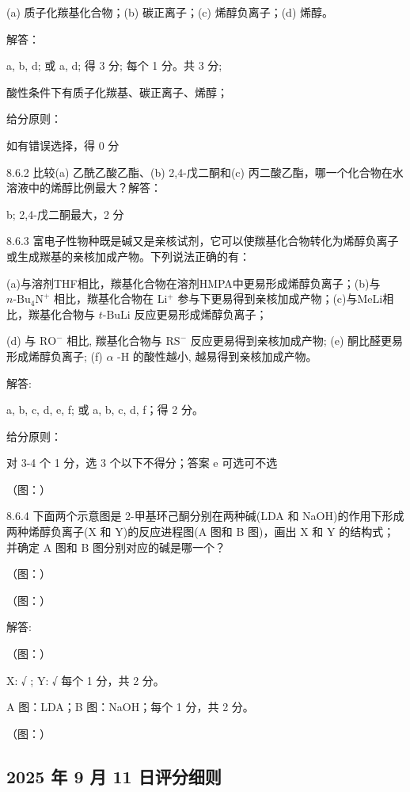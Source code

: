 (a) 质子化羰基化合物；(b) 碳正离子；(c) 烯醇负离子；(d) 烯醇。

解答：

a, b, d; 或 a, d; 得 3 分; 每个 1 分。共 3 分;

酸性条件下有质子化羰基、碳正离子、烯醇；

给分原则：

如有错误选择，得 0 分

8.6.2 比较(a) 乙酰乙酸乙酯、(b) 2,4-戊二酮和(c) 丙二酸乙酯，哪一个化合物在水溶液中的烯醇比例最大？解答：

b; 2,4-戊二酮最大，2 分

8.6.3 富电子性物种既是碱又是亲核试剂，它可以使羰基化合物转化为烯醇负离子或生成羰基的亲核加成产物。下列说法正确的有：

(a)与溶剂THF相比，羰基化合物在溶剂HMPA中更易形成烯醇负离子；(b)与 $n\text{-Bu}_4\mathrm{N}^+$ 相比，羰基化合物在 $\mathrm{Li^{+}}$ 参与下更易得到亲核加成产物；(c)与MeLi相比，羰基化合物与 $t\text{-BuLi}$ 反应更易形成烯醇负离子；

(d) 与 $\mathrm{RO}^{-}$ 相比, 羰基化合物与 $\mathrm{RS}^{-}$ 反应更易得到亲核加成产物; (e) 酮比醛更易形成烯醇负离子; (f) $\alpha$ -H 的酸性越小, 越易得到亲核加成产物。

解答:

a, b, c, d, e, f; 或 a, b, c, d, f；得 2 分。

给分原则：

对 3-4 个 1 分，选 3 个以下不得分；答案 e 可选可不选

（图：）

8.6.4 下面两个示意图是 2-甲基环己酮分别在两种碱(LDA 和 NaOH)的作用下形成两种烯醇负离子(X 和 Y)的反应进程图(A 图和 B 图)，画出 X 和 Y 的结构式；并确定 A 图和 B 图分别对应的碱是哪一个？

（图：）

（图：）

解答:

（图：）

X: √ ; Y: √ 每个 1 分，共 2 分。

A 图：LDA；B 图：NaOH；每个 1 分，共 2 分。

（图：）

\subsection*{2025 年 9 月 11 日评分细则}
